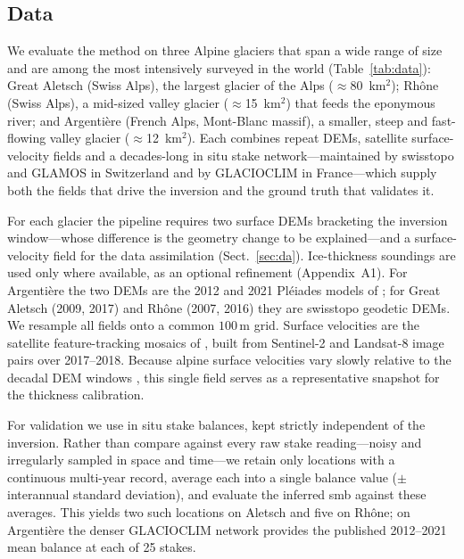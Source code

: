 \subsection{Data}\label{sec:data}

We evaluate the method on three Alpine glaciers that span a wide range of size and
are among the most intensively surveyed in the world (Table~\ref{tab:data}): Great
Aletsch (Swiss Alps), the largest glacier of the Alps ($\approx$80~km$^2$); Rhône
(Swiss Alps), a mid-sized valley glacier ($\approx$15~km$^2$) that feeds the
eponymous river; and Argentière (French Alps, Mont-Blanc massif), a smaller, steep
and fast-flowing valley glacier ($\approx$12~km$^2$). Each combines repeat DEMs,
satellite surface-velocity fields and a decades-long in situ stake
network---maintained by swisstopo and GLAMOS in Switzerland and by GLACIOCLIM in
France---which supply both the fields that drive the inversion and the ground truth
that validates it.

For each glacier the pipeline requires two surface DEMs bracketing the inversion
window---whose difference is the geometry change to be explained---and a
surface-velocity field for the data assimilation (Sect.~\ref{sec:da}).
Ice-thickness soundings are used only where available, as an optional refinement
(Appendix~A1). For Argentière the two DEMs are the 2012 and 2021 Pléiades
models of \citet{kneib2024}; for Great Aletsch (2009, 2017) and Rhône (2007, 2016)
they are swisstopo geodetic DEMs. We resample all fields onto a common
$100\,\mathrm{m}$ grid. Surface velocities are the satellite feature-tracking
mosaics of \citet{millan2022}, built from Sentinel-2 and Landsat-8 image pairs over
2017--2018. Because alpine surface velocities vary slowly relative to the decadal DEM
windows \citep{dehecq2019}, this single field serves as a representative snapshot for
the thickness calibration.

For validation we use in situ stake balances, kept strictly independent of the
inversion. Rather than compare against every raw stake reading---noisy and
irregularly sampled in space and time---we retain only locations with a continuous
multi-year record, average each into a single balance value ($\pm$ interannual
standard deviation), and evaluate the inferred smb against these averages.
This yields two such locations on Aletsch and five on Rhône; on Argentière the denser GLACIOCLIM
network provides the published 2012--2021 mean balance at each of 25 stakes.

